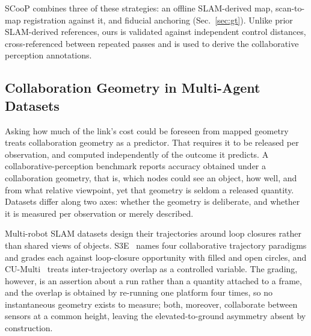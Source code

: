 \documentclass[conference]{IEEEtran}
\begin{document}
SCooP combines three of these strategies: an offline SLAM-derived map, scan-to-map registration against it, and fiducial anchoring
(Sec.~\ref{sec:gt}). Unlike prior SLAM-derived references, ours is
validated against independent control distances, cross-referenced between repeated passes and is used to derive the collaborative perception annotations.

\subsection{Collaboration Geometry in Multi-Agent Datasets}
\label{sec:geometry}

Asking how much of the link's cost could be foreseen from mapped
geometry treats collaboration geometry as a predictor. That requires
it to be released per observation, and computed independently of the
outcome it predicts. A collaborative-perception benchmark reports
accuracy obtained under a collaboration geometry, that is, which nodes
could see an object, how well, and from what relative viewpoint, yet
that geometry is seldom a released quantity. Datasets differ along two
axes: whether the geometry is deliberate, and whether it is measured
per observation or merely described.

Multi-robot SLAM datasets design their trajectories around loop
closures rather than shared views of objects. S3E~\cite{s3e} names four
collaborative trajectory paradigms and grades each against loop-closure
opportunity with filled and open circles, and CU-Multi~\cite{cumulti} treats inter-trajectory overlap as a controlled variable. The grading, however, is an assertion about a run rather than a quantity attached to a frame, and the overlap is obtained by re-running one platform four times, so no instantaneous geometry exists to measure; both, moreover, collaborate between sensors at a common height, leaving the elevated-to-ground asymmetry absent by construction.
\end{document}
